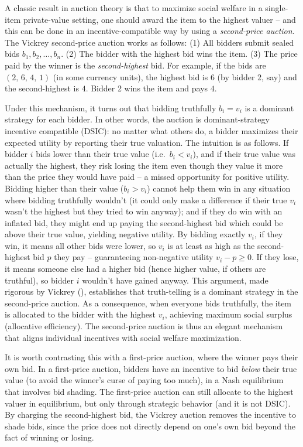 \documentclass[
  letterpaper,
  numbers=noenddot,
  DIV=11]{scrreprt}
\theoremstyle{definition}
\theoremstyle{plain}
\theoremstyle{plain}
\theoremstyle{remark}
\begin{document}
A classic result in auction theory is that to maximize social welfare in
a single-item private-value setting, one should award the item to the
highest valuer -- and this can be done in an incentive-compatible way by
using a \emph{second-price auction}. The Vickrey second-price auction
works as follows: (1) All bidders submit sealed bids
\(b_1, b_2, \ldots, b_n\). (2) The bidder with the highest bid wins the
item. (3) The price paid by the winner is the \emph{second-highest} bid.
For example, if the bids are \((2,\, 6,\, 4,\, 1)\) (in some currency
units), the highest bid is \(6\) (by bidder 2, say) and the
second-highest is \(4\). Bidder 2 wins the item and pays \(4\).

Under this mechanism, it turns out that bidding truthfully \(b_i = v_i\)
is a dominant strategy for each bidder. In other words, the auction is
dominant-strategy incentive compatible (DSIC): no matter what others do,
a bidder maximizes their expected utility by reporting their true
valuation. The intuition is as follows. If bidder \(i\) bids lower than
their true value (i.e.~\(b_i < v_i\)), and if their true value was
actually the highest, they risk losing the item even though they value
it more than the price they would have paid -- a missed opportunity for
positive utility. Bidding higher than their value (\(b_i > v_i\)) cannot
help them win in any situation where bidding truthfully wouldn't (it
could only make a difference if their true \(v_i\) wasn't the highest
but they tried to win anyway); and if they do win with an inflated bid,
they might end up paying the second-highest bid which could be above
their true value, yielding negative utility. By bidding exactly \(v_i\),
if they win, it means all other bids were lower, so \(v_i\) is at least
as high as the second-highest bid \(p\) they pay -- guaranteeing
non-negative utility \(v_i - p \ge 0\). If they lose, it means someone
else had a higher bid (hence higher value, if others are truthful), so
bidder \(i\) wouldn't have gained anyway. This argument, made rigorous
by Vickrey (),
establishes that truth-telling is a dominant strategy in the
second-price auction. As a consequence, when everyone bids truthfully,
the item is allocated to the bidder with the highest \(v_i\), achieving
maximum social surplus (allocative efficiency). The second-price auction
is thus an elegant mechanism that aligns individual incentives with
social welfare maximization.

It is worth contrasting this with a first-price auction, where the
winner pays their own bid. In a first-price auction, bidders have an
incentive to bid \emph{below} their true value (to avoid the winner's
curse of paying too much), in a Nash equilibrium that involves bid
shading. The first-price auction can still allocate to the highest
valuer in equilibrium, but only through strategic behavior (and it is
not DSIC). By charging the second-highest bid, the Vickrey auction
removes the incentive to shade bids, since the price does not directly
depend on one's own bid beyond the fact of winning or losing.
\end{document}
